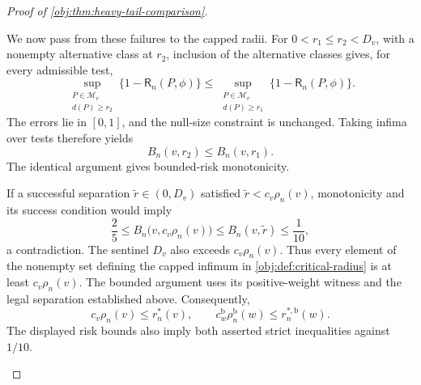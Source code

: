 \documentclass[11pt]{article}
\begin{document}
\begin{proof}[Proof of \cref{obj:thm:heavy-tail-comparison}]
\begin{enumerate}
We now pass from these failures to the capped radii. For
\(0<r_1\le r_2<D_v\), with a nonempty alternative class at \(r_2\), inclusion of the alternative classes gives, for every admissible test,
\[
\sup_{\substack{P\in\mathcal M_v\\ d(P)\ge r_2}}
 \{1-\mathsf R_n(P,\phi)\}
\le
\sup_{\substack{P\in\mathcal M_v\\ d(P)\ge r_1}}
 \{1-\mathsf R_n(P,\phi)\}.
\]
The errors lie in \([0,1]\), and the null-size constraint is unchanged. Taking infima over tests therefore yields
\[
B_n(v,r_2)\le B_n(v,r_1).
\]
The identical argument gives bounded-risk monotonicity.

If a successful separation \(\widetilde r\in(0,D_v)\) satisfied
\(\widetilde r<c_v\rho_n(v)\), monotonicity and its success condition would imply
\[
\frac25
\le B_n\bigl(v,c_v\rho_n(v)\bigr)
\le B_n(v,\widetilde r)
\le\frac1{10},
\]
a contradiction. The sentinel \(D_v\) also exceeds \(c_v\rho_n(v)\). Thus every element of the nonempty set defining the capped infimum in \cref{obj:def:critical-radius} is at least \(c_v\rho_n(v)\). The bounded argument uses its positive-weight witness and the legal separation established above. Consequently,
\[
c_v\rho_n(v)\le r_n^*(v),
\qquad
c_w^{\mathrm b}\rho_n^{\mathrm b}(w)
\le r_n^{*,\mathrm b}(w).
\]
The displayed risk bounds also imply both asserted strict inequalities against \(1/10\).


\end{enumerate}
\end{proof}
\end{document}
